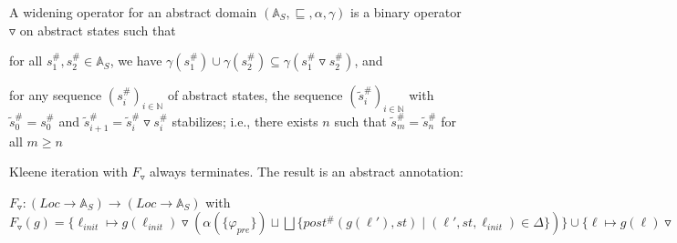 \documentclass[landscape, a4paper]{article}
\begin{document}
\begin{minipage}[t]{0.2\linewidth}
\begin{betterlist}
\begin{betterlist}
			\item \color{orange}A \alert{widening operator} for an abstract domain $(\mathbb{A}_S, \sqsubseteq, \alpha, \gamma)$ is a binary operator $\triangledown$ on abstract states such that
			\begin{betterlist}
				\item for all $s^\#_1, s^\#_2 \in \mathbb{A}_S$, we have $\gamma(s^\#_1) \cup \gamma(s^\#_2) \subseteq \gamma(s^\#_1 \triangledown s^\#_2)$, and
				\item for any sequence $(s^\#_i)_{i\in \mathbb{N}}$ of abstract states, the sequence $(\tilde s^\#_i)_{i\in \mathbb{N}}$ with $\tilde s^\#_0 = s^\#_0$ and $\tilde s^\#_{i+1} = \tilde s^\#_i \triangledown s^\#_i$ stabilizes; i.e., there exists $n$ such that $\tilde s^\#_m = \tilde s^\#_n$ for all $m \ge n$\color{black}
			\end{betterlist}
			\item \color{orange}Kleene iteration with $F_{\triangledown}$ always terminates. The result is an abstract annotation:
			\begin{betterlist}
				\item $F_{\triangledown}: (Loc \rightarrow \mathbb{A}_S) \rightarrow (Loc \rightarrow \mathbb{A}_S)$ with $F_{\triangledown}(g) = \{\ell_{init} \mapsto g(\ell_{init}) \triangledown(\alpha(\{\varphi_{pre}\}) \sqcup \bigsqcup \{post^\#(g(\ell'), st) \mid (\ell', st, \ell_{init}) \in \Delta\})\}\cup \{\ell\mapsto g(\ell) \triangledown \bigsqcup\{post^\#(g(\ell'), st) \mid (\ell', st, \ell) \in \Delta\} \mid \ell \in Loc \setminus \{\ell_{init}\}\}$\color{black}
			\end{betterlist}
		\end{betterlist}
	\end{betterlist}
\end{minipage}
\end{document}
